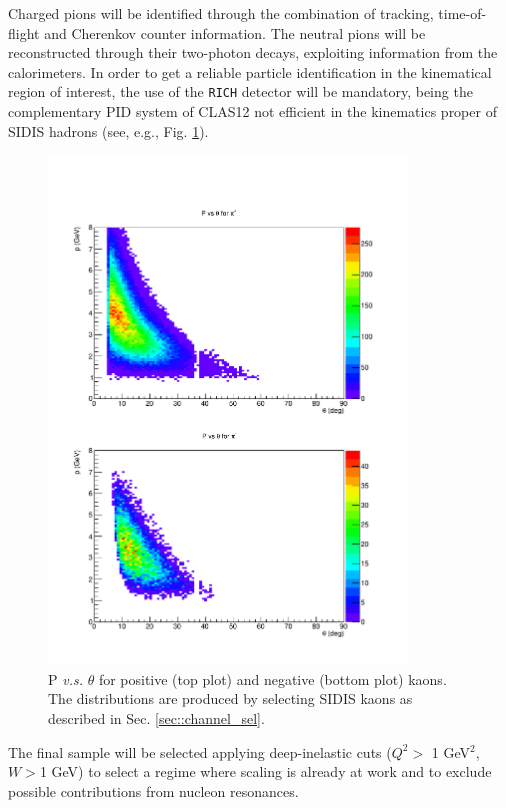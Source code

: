 Charged pions will be identified through the combination of tracking, time-of-flight and Cherenkov counter information. The neutral pions will be reconstructed through their two-photon decays, exploiting information from the calorimeters.
In order to get a reliable particle identification in the kinematical region of interest, the use of the \texttt{RICH} detector will be mandatory, being the complementary PID system of CLAS12 not efficient in the kinematics proper of SIDIS hadrons (see, e.g., Fig. \ref{fig::kaon_p_theta}).
%
%
\begin{figure}
\centering
\includegraphics[width=0.85\textwidth]{sidis/kaon_p_theta.pdf}
\caption{\label{fig::kaon_p_theta} P \textit{v.s.} $\theta$ for positive (top plot) and negative (bottom plot) kaons. The distributions are produced by selecting SIDIS kaons as described in Sec. \ref{sec::channel_sel}.}
\end{figure}
%
%
The final sample will be selected applying deep-inelastic cuts ($Q^2>$ 1 GeV$^2$, $W>$1 GeV) to select a regime where scaling is already at work and to exclude possible contributions from nucleon resonances. 
